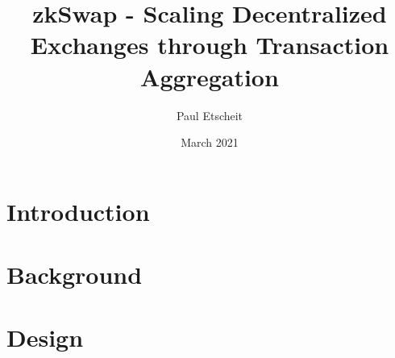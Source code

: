 \documentclass[11pt,twoside,a4paper,final]{book}
\title{zkSwap - Scaling Decentralized Exchanges through Transaction Aggregation}
\author{Paul Etscheit}
\date{March 2021}
\begin{document}
\begin{titlepage}
\maketitle
\end{titlepage}

\section{Introduction}


\section{Background}


\section{Design}




\end{document}

